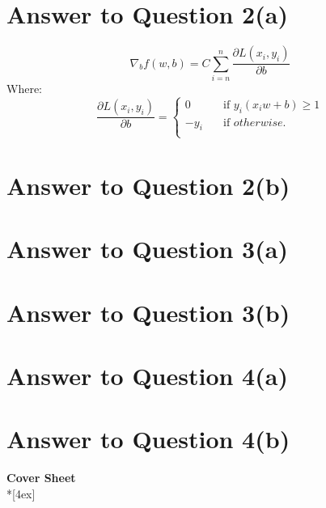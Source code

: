 \documentclass[11pt]{article}
\begin{document}
\pagebreak[4]
\section*{Answer to Question 2(a)}
$$
\nabla_b f(w, b) = C\sum_{i=n}^{n}\frac{\partial L(x_i, y_i)}{\partial b}
$$
Where:
$$
\frac{\partial L(x_i, y_i)}{\partial b} =
  \begin{cases}
    0       & \quad \text{if } y_i(x_i w + b) \geq 1\\
    -y_i  & \quad \text{if } otherwise.\\
  \end{cases}
$$

\pagebreak[4]
\section*{Answer to Question 2(b)}

\pagebreak[4]
\section*{Answer to Question 3(a)}

\pagebreak[4]
\section*{Answer to Question 3(b)}

\pagebreak[4]
\section*{Answer to Question 4(a)}

\pagebreak[4]
\section*{Answer to Question 4(b)}

\pagebreak[4]
\begin{center}
\LARGE{\bf \textsf{Cover Sheet}} \\*[4ex]
\end{center}
\end{document}
